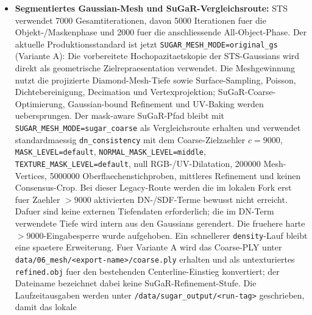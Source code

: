 \documentclass[12pt,a4paper]{article}
\begin{document}
\begin{itemize}
                Eingabeartefakte des gewaehlten Startpunkts muessen bereits
                vorhanden und zueinander passend sein. Die SuGaR-Runner schuetzen
                bestehende Run-Tags weiterhin vor unbeabsichtigtem Ueberschreiben.
                Die Trennung von explizitem Erstlauf und zentralisiertem Replay ist
                damit derzeit absichtlich: Sie verbindet eine gut nachvollziehbare
                Benutzerfuehrung mit reproduzierbaren Wiederholungslaeufen.
        \item \textbf{Segmentiertes Gaussian-Mesh und SuGaR-Vergleichsroute:} STS
            verwendet 7000 Gesamtiterationen, davon 5000 Iterationen fuer die
            Objekt-/Maskenphase und 2000 fuer die anschliessende All-Object-Phase.
            Der aktuelle Produktionsstandard ist jetzt
            \texttt{SUGAR\_MESH\_MODE=original\_gs} (Variante A): Die vorbereitete
            Hochopazitaetskopie der STS-Gaussians wird direkt als geometrische
            Zielrepraesentation verwendet. Die Meshgewinnung nutzt die projizierte
            Diamond-Mesh-Tiefe sowie Surface-Sampling, Poisson, Dichtebereinigung,
            Decimation und Vertexprojektion; SuGaR-Coarse-Optimierung,
            Gaussian-bound Refinement und UV-Baking werden uebersprungen. Der
            mask-aware SuGaR-Pfad bleibt mit
            \texttt{SUGAR\_MESH\_MODE=sugar\_coarse} als Vergleichsroute erhalten
            und verwendet standardmaessig \texttt{dn\_consistency} mit dem
            Coarse-Zielzaehler $c=9000$, \texttt{MASK\_LEVEL=default},
          \texttt{NORMAL\_MASK\_LEVEL=middle},
          \texttt{TEXTURE\_MASK\_LEVEL=default}, null RGB-/UV-Dilatation,
          200000 Mesh-Vertices, 5000000 Oberflaechenstichproben, mittleres
          Refinement und keinen Consensus-Crop. Bei dieser Legacy-Route werden die im
          lokalen Fork erst fuer Zaehler $>9000$ aktivierten DN-/SDF-Terme
          bewusst nicht erreicht. Dafuer sind keine externen Tiefendaten
          erforderlich; die im DN-Term verwendete Tiefe wird intern aus den
          Gaussians gerendert. Die fruehere harte $>9000$-Eingabesperre wurde
          aufgehoben. Ein schnellerer \texttt{density}-Lauf bleibt eine
          spaetere Erweiterung. Fuer Variante A wird das Coarse-PLY unter
          \texttt{data/06\_mesh/<export-name>/coarse.ply} erhalten und als
          untexturiertes \texttt{refined.obj} fuer den bestehenden
          Centerline-Einstieg konvertiert; der Dateiname bezeichnet dabei keine
          SuGaR-Refinement-Stufe. Die Laufzeitausgaben werden unter
           \texttt{/data/sugar\_output/<run-tag>} geschrieben, damit das lokale

\end{itemize}
\end{document}
